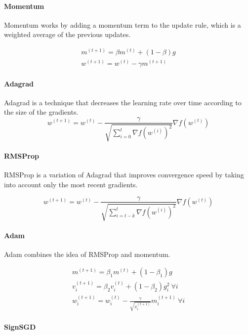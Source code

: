 \documentclass{article}
\begin{document}
\paragraph{Momentum}

Momentum works by adding a momentum term to the update rule, which is a weighted average of the previous updates.

\begin{gather*}
m^{(t+1)} = \beta m^{(t)} + (1 - \beta)g \\
w^{(t+1)} = w^{(t)} - \gamma m^{(t+1)}
\end{gather*}

\paragraph{Adagrad}

Adagrad is a technique that decreases the learning rate over time according to the size of the gradients.
$$
w^{(t+1)} = w^{(t)} - \frac{\gamma}{\sqrt{\sum_{i=0}^t \nabla f(w^{(i)})^2}} \nabla f(w^{(t)})
$$

\paragraph{RMSProp}

RMSProp is a variation of Adagrad that improves convergence speed by taking into account only the most recent gradients.

$$
w^{(t+1)} = w^{(t)} - \frac{\gamma}{\sqrt{\sum_{i=t-k}^t \nabla f(w^{(i)})^2}} \nabla f(w^{(t)})
$$

\paragraph{Adam}

Adam combines the idea of RMSProp and momentum.

\begin{gather*}
m^{(t+1)} = \beta_1 m^{(t)} + (1 - \beta_1)g \\
v_i^{(t+1)} = \beta_2 v_i^{(t)} + (1 - \beta_2) g_i^2 \ \forall i \\
w_i^{(t+1)} = w_i^{(t)} - \frac{\gamma}{\sqrt{v_i^{(t+1)}}} m_i^{(t+1)} \ \forall i
\end{gather*}

\paragraph{SignSGD}
\end{document}
